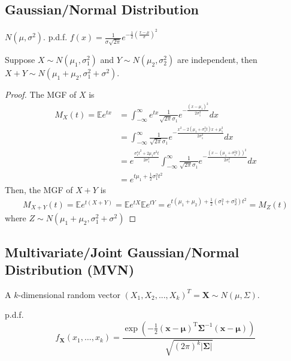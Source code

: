 \documentclass[11pt]{elegantbook}
\begin{document}
\subsection{Gaussian/Normal Distribution}
$N(\mu,\sigma^2)$. p.d.f. ${\displaystyle f(x)={\frac {1}{\sigma {\sqrt {2\pi }}}}e^{-{\frac {1}{2}}\left({\frac {x-\mu }{\sigma }}\right)^{2}}}$
\begin{theorem}
Suppose $X\sim N(\mu_1,\sigma_1^2)$ and $Y\sim N(\mu_2,\sigma_2^2)$ are independent, then $X+Y\sim N(\mu_1+\mu_2,\sigma_1^2+\sigma^2)$.
\end{theorem}
\begin{proof}
The MGF of $X$ is
\begin{equation}
    \begin{aligned}
        M_X(t)=\mathbb{E}e^{tx}&=\int_{-\infty}^{\infty}e^{tx}\frac{1}{\sqrt{2\pi}\sigma_1}e^{-\frac{(x-\mu_1)^2}{2\sigma_1^2}}dx\\
        &=\int_{-\infty}^{\infty}\frac{1}{\sqrt{2\pi}\sigma_1}e^{-\frac{x^2-2(\mu_1+\sigma_1^2t)x+\mu_1^2}{2\sigma_1^2}}dx\\
        &=e^{\frac{\sigma_1^4t^2+2\mu_1\sigma^2t}{2\sigma_1^2}}\int_{-\infty}^{\infty}\frac{1}{\sqrt{2\pi}\sigma_1}e^{-\frac{(x-(\mu_1+\sigma_1^2t))^2}{2\sigma_1^2}}dx\\
        &=e^{t\mu_1+\frac{1}{2}\sigma_1^2t^2}
    \end{aligned}
    \nonumber
\end{equation}
Then, the MGF of $X+Y$ is
\begin{equation}
    \begin{aligned}
        M_{X+Y}(t)=\mathbb{E}e^{t(X+Y)}=\mathbb{E}e^{tX}\mathbb{E}e^{tY}=e^{t(\mu_1+\mu_2)+\frac{1}{2}(\sigma_1^2+\sigma_2^2)t^2}=M_{Z}(t)
    \end{aligned}
    \nonumber
\end{equation}
where $Z\sim N(\mu_1+\mu_2,\sigma_1^2+\sigma^2)$
\end{proof}

\subsection{Multivariate/Joint Gaussian/Normal Distribution (MVN)}
A $k$-dimensional random vector $(X_1,X_2,...,X_k)^T=\mathbf{X}\sim N(\mu,\Sigma)$.

p.d.f. $${\displaystyle f_{\mathbf {X} }(x_{1},\ldots ,x_{k})={\frac {\exp \left(-{\frac {1}{2}}({\mathbf {x} }-{\boldsymbol {\mu }})^{\mathrm {T} }{\boldsymbol {\Sigma }}^{-1}({\mathbf {x} }-{\boldsymbol {\mu }})\right)}{\sqrt {(2\pi )^{k}|{\boldsymbol {\Sigma }}|}}}}$$
\end{document}
